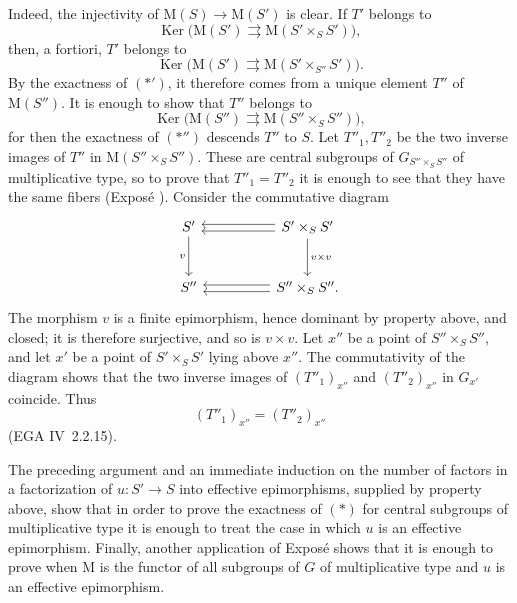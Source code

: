 Indeed, the injectivity of
\(\mathrm M(S)\to\mathrm M(S')\) is clear. If \(T'\) belongs to
\[
  \operatorname{Ker}\bigl(
    \mathrm M(S')\rightrightarrows
    \mathrm M(S'\times_S S')\bigr),
\]
then, a fortiori, \(T'\) belongs to
\[
  \operatorname{Ker}\bigl(
    \mathrm M(S')\rightrightarrows
    \mathrm M(S'\times_{S''}S')\bigr).
\]
By the exactness of \((*')\), it therefore comes from a unique
element \(T''\) of \(\mathrm M(S'')\). It is enough to show that
\(T''\) belongs to
\[
  \operatorname{Ker}\bigl(
    \mathrm M(S'')\rightrightarrows
    \mathrm M(S''\times_S S'')\bigr),
\]
for then the exactness of \((*'')\) descends \(T''\) to \(S\).
Let \(T''_1,T''_2\) be the two inverse images of \(T''\) in
\(\mathrm M(S''\times_S S'')\). These are central subgroups of
\(G_{S''\times_S S''}\) of multiplicative type, so to prove that
\(T''_1=T''_2\) it is enough to see that they have the same fibers
(Exposé ). Consider the commutative diagram
\[
\begin{tikzcd}[column sep=huge,row sep=large]
S' \arrow[d,"v"'] &
  S'\times_S S' \arrow[l,shift left=.55ex]
    \arrow[l,shift right=.55ex] \arrow[d,"v\times v"]\\
S'' &
  S''\times_S S'' . \arrow[l,shift left=.55ex]
    \arrow[l,shift right=.55ex]
\end{tikzcd}
\]
The morphism \(v\) is a finite epimorphism, hence dominant by
property \textup{} above, and closed; it is therefore surjective,
and so is \(v\times v\). Let \(x''\) be a point of
\(S''\times_S S''\), and let \(x'\) be a point of
\(S'\times_S S'\) lying above \(x''\). The commutativity of the
diagram shows that the two inverse images of
\((T''_1)_{x''}\) and \((T''_2)_{x''}\) in \(G_{x'}\) coincide.
Thus
\[
  (T''_1)_{x''}=(T''_2)_{x''}
\]
(EGA IV~2.2.15).

The preceding argument and an immediate induction on the number of
factors in a factorization of \(u:S'\to S\) into effective
epimorphisms, supplied by property \textup{} above, show that in
order to prove the exactness of \((*)\) for central subgroups of
multiplicative type it is enough to treat the case in which \(u\)
is an effective epimorphism. Finally, another application of
Exposé  shows that it is enough to prove  when
\(\mathrm M\) is the functor of all subgroups of \(G\) of
multiplicative type and \(u\) is an effective epimorphism.

